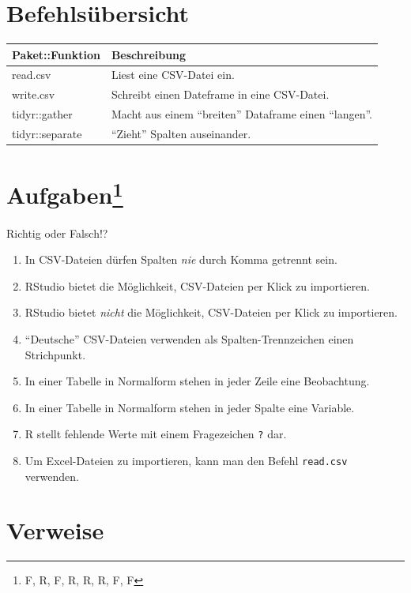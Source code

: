 \documentclass[12pt,ngerman,]{book}
\providecommand{\tightlist}{%
  \setlength{\itemsep}{0pt}\setlength{\parskip}{0pt}}
\let\rmarkdownfootnote\footnote%
\def\footnote{\protect\rmarkdownfootnote}
\let\BeginKnitrBlock\begin \let\EndKnitrBlock\end
\begin{document}
\section{Befehlsübersicht}\label{befehlsubersicht-1}

\begin{longtable}[]{@{}ll@{}}
\toprule
Paket::Funktion & Beschreibung\tabularnewline
\midrule
\endhead
read.csv & Liest eine CSV-Datei ein.\tabularnewline
write.csv & Schreibt einen Dateframe in eine CSV-Datei.\tabularnewline
tidyr::gather & Macht aus einem ``breiten'' Dataframe einen
``langen''.\tabularnewline
tidyr::separate & ``Zieht'' Spalten auseinander.\tabularnewline
\bottomrule
\end{longtable}

\section[Aufgaben]{\texorpdfstring{Aufgaben\footnote{F, R, F, R, R, R,
  F, F}}{Aufgaben}}\label{aufgaben-2}

\BeginKnitrBlock{rmdexercises}
Richtig oder Falsch!?

\begin{enumerate}
\def\labelenumi{\arabic{enumi}.}
\tightlist
\item
  In CSV-Dateien dürfen Spalten \emph{nie} durch Komma getrennt sein.
\item
  RStudio bietet die Möglichkeit, CSV-Dateien per Klick zu importieren.
\item
  RStudio bietet \emph{nicht} die Möglichkeit, CSV-Dateien per Klick zu
  importieren.
\item
  ``Deutsche'' CSV-Dateien verwenden als Spalten-Trennzeichen einen
  Strichpunkt.
\item
  In einer Tabelle in Normalform stehen in jeder Zeile eine Beobachtung.
\item
  In einer Tabelle in Normalform stehen in jeder Spalte eine Variable.
\item
  R stellt fehlende Werte mit einem Fragezeichen \texttt{?} dar.
\item
  Um Excel-Dateien zu importieren, kann man den Befehl \texttt{read.csv}
  verwenden.
\end{enumerate}
\EndKnitrBlock{rmdexercises}

\section{Verweise}\label{verweise-1}
\end{document}
